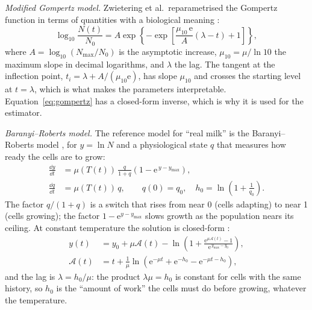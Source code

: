 \textit{Modified Gompertz model.} Zwietering et al.\ reparametrised the Gompertz function \cite{gompertz1825} in terms of quantities with a biological meaning \cite{zwietering1990}:
\begin{equation}\label{eq:gompertz}
\log_{10}\frac{N(t)}{N_0}=A\exp\!\left\{-\exp\!\left[\frac{\mu_{10}\,\mathrm{e}}{A}(\lambda-t)+1\right]\right\},
\end{equation}
where $A=\log_{10}(N_{\max}/N_0)$ is the asymptotic increase, $\mu_{10}=\mu/\ln10$ the maximum slope in decimal logarithms, and $\lambda$ the lag. The tangent at the inflection point, $t_i=\lambda+A/(\mu_{10}\mathrm{e})$, has slope $\mu_{10}$ and crosses the starting level at $t=\lambda$, which is what makes the parameters interpretable. Equation~\eqref{eq:gompertz} has a closed-form inverse, which is why it is used for the estimator.

\textit{Baranyi--Roberts model.} The reference model for ``real milk'' is the Baranyi--Roberts model \cite{baranyi1993,baranyi1994}, for $y=\ln N$ and a physiological state $q$ that measures how ready the cells are to grow:
\begin{align}
\frac{\dd y}{\dd t} &= \mu(T(t))\,\frac{q}{1+q}\left(1-\mathrm{e}^{\,y-y_{\max}}\right), \label{eq:bar}\\
\frac{\dd q}{\dd t} &= \mu(T(t))\,q, \qquad q(0)=q_0,\quad h_0=\ln\!\left(1+\tfrac1{q_0}\right).\label{eq:barq}
\end{align}
The factor $q/(1+q)$ is a switch that rises from near 0 (cells adapting) to near 1 (cells growing); the factor $1-\mathrm{e}^{y-y_{\max}}$ slows growth as the population nears its ceiling. At constant temperature the solution is closed-form \cite{baranyi1994}:
\begin{align}
y(t)&=y_0+\mu\mathcal{A}(t)-\ln\!\left(1+\frac{\mathrm{e}^{\mu\mathcal{A}(t)}-1}{\mathrm{e}^{\,y_{\max}-y_0}}\right),\label{eq:barcf}\\
\mathcal{A}(t)&=t+\frac1\mu\ln\!\left(\mathrm{e}^{-\mu t}+\mathrm{e}^{-h_0}-\mathrm{e}^{-\mu t-h_0}\right),\nonumber
\end{align}
and the lag is $\lambda=h_0/\mu$: the product $\lambda\mu=h_0$ is constant for cells with the same history, so $h_0$ is the ``amount of work'' the cells must do before growing, whatever the temperature.


